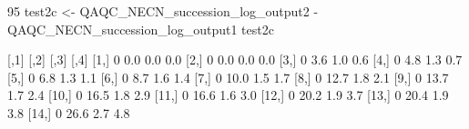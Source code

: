 95%
test2c <- QAQC_NECN_succession_log_output2 - QAQC_NECN_succession_log_output1
test2c

      [,1] [,2] [,3] [,4]
 [1,]    0  0.0  0.0  0.0
 [2,]    0  0.0  0.0  0.0
 [3,]    0  3.6  1.0  0.6
 [4,]    0  4.8  1.3  0.7
 [5,]    0  6.8  1.3  1.1
 [6,]    0  8.7  1.6  1.4
 [7,]    0 10.0  1.5  1.7
 [8,]    0 12.7  1.8  2.1
 [9,]    0 13.7  1.7  2.4
[10,]    0 16.5  1.8  2.9
[11,]    0 16.6  1.6  3.0
[12,]    0 20.2  1.9  3.7
[13,]    0 20.4  1.9  3.8
[14,]    0 26.6  2.7  4.8










